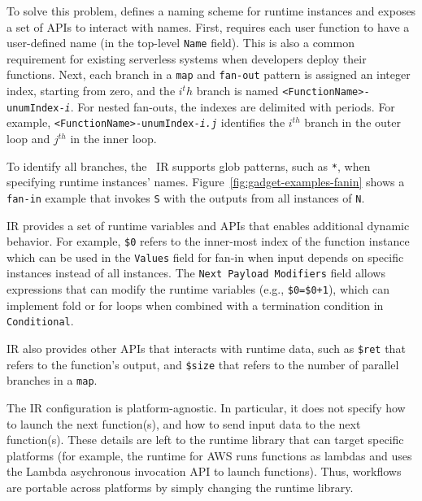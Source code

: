 To solve this problem, \name{} defines a naming scheme for runtime instances
and exposes a set of APIs to interact with names. First,
\name{} requires each user function to have a user-defined name (in the
top-level \texttt{Name} field). This is also a common requirement for existing
serverless systems when developers deploy their functions. Next, each branch
in a \texttt{map} and \texttt{fan-out} pattern is assigned an integer index,
starting from zero, and the $i^th$ branch is named
\texttt{<FunctionName>-unumIndex-\emph{i}}. For nested fan-outs, the indexes
are delimited with periods. For example,
\texttt{<FunctionName>-unumIndex-\emph{i.j}} identifies the $i^{th}$ branch in
the outer loop and $j^{th}$ in the inner loop.

To identify all branches, the \name{}~IR supports glob patterns, such as
\texttt{*}, when specifying runtime instances' names.
Figure~\ref{fig:gadget-examples-fanin} shows a \texttt{fan-in} example that
invokes \texttt{S} with the outputs from all instances of \texttt{N}.

\name{} IR provides a set of runtime variables and APIs that enables
additional dynamic behavior. For example, \texttt{\$0} refers to the
inner-most index of the function instance which can be used in the
\texttt{Values} field for fan-in when input depends on specific instances
instead of all instances. The \texttt{Next Payload Modifiers} field allows
expressions that can modify the runtime variables (e.g., \texttt{\$0=\$0+1}),
which can implement fold or for loops when combined with a termination
condition in \texttt{Conditional}.


\name{} IR also provides other APIs that interacts with runtime data, such as
\texttt{\$ret} that refers to the function's output, and \texttt{\$size} that
refers to the number of parallel branches in a \texttt{map}.








The IR configuration is platform-agnostic. In particular, it does not specify
how to launch the next function(s), and how to send input data to the next
function(s). These details are left to the \name{} runtime library that can
target specific platforms (for example, the runtime for AWS runs functions as
lambdas and uses the Lambda asychronous invocation API to launch functions).
Thus, workflows are portable across platforms by simply changing the runtime
library.



